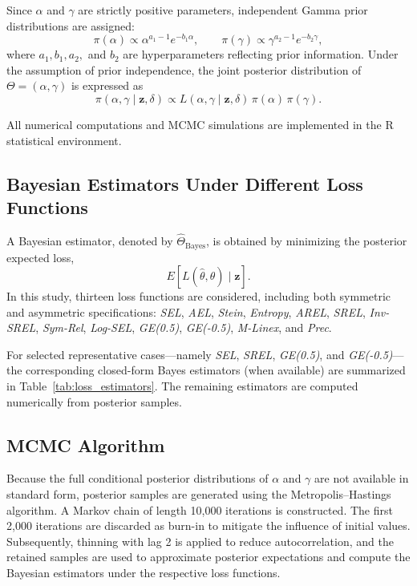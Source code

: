 \documentclass[twoside]{article}
\begin{document}
Since $\alpha$ and $\gamma$ are strictly positive parameters, independent Gamma prior distributions are assigned:
\begin{equation}
\pi(\alpha) \propto \alpha^{a_1 - 1} e^{-b_1 \alpha}, 
\qquad
\pi(\gamma) \propto \gamma^{a_2 - 1} e^{-b_2 \gamma},
\end{equation}
where $a_1, b_1, a_2,$ and $b_2$ are hyperparameters reflecting prior information. Under the assumption of prior independence, the joint posterior distribution of $\Theta = (\alpha, \gamma)$ is expressed as
\begin{equation}
\pi(\alpha, \gamma \mid \mathbf{z}, \delta)
\propto
L(\alpha, \gamma \mid \mathbf{z}, \delta)
\, \pi(\alpha)\, \pi(\gamma).
\end{equation}

All numerical computations and MCMC simulations are implemented in the \textsf{R} statistical environment.

\subsection{Bayesian Estimators Under Different Loss Functions}

A Bayesian estimator, denoted by $\hat{\Theta}_{\text{Bayes}}$, is obtained by minimizing the posterior expected loss,
\[
E\!\left[L(\hat{\theta}, \theta)\mid \mathbf{z}\right].
\]
In this study, thirteen loss functions are considered, including both symmetric and asymmetric specifications: \textit{SEL}, \textit{AEL}, \textit{Stein}, \textit{Entropy}, \textit{AREL}, \textit{SREL}, \textit{Inv-SREL}, \textit{Sym-Rel}, \textit{Log-SEL}, \textit{GE(0.5)}, \textit{GE(-0.5)}, \textit{M-Linex}, and \textit{Prec}. 

For selected representative cases—namely \textit{SEL}, \textit{SREL}, \textit{GE(0.5)}, and \textit{GE(-0.5)}—the corresponding closed-form Bayes estimators (when available) are summarized in Table~\ref{tab:loss_estimators}. The remaining estimators are computed numerically from posterior samples.

\subsection{MCMC Algorithm}

Because the full conditional posterior distributions of $\alpha$ and $\gamma$ are not available in standard form, posterior samples are generated using the Metropolis--Hastings algorithm. A Markov chain of length 10,000 iterations is constructed. The first 2,000 iterations are discarded as burn-in to mitigate the influence of initial values. Subsequently, thinning with lag 2 is applied to reduce autocorrelation, and the retained samples are used to approximate posterior expectations and compute the Bayesian estimators under the respective loss functions.
\end{document}
